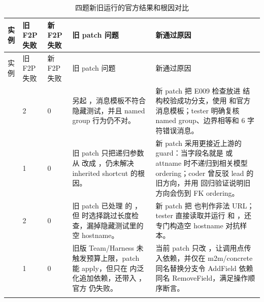 \documentclass[UTF8,a4paper,11pt]{ctexart}
\begin{document}
\begin{center}
{\scriptsize
\setlength{\tabcolsep}{2pt}
\begin{longtable}{L{3.0cm} C{1.2cm} C{1.2cm} L{3.7cm} L{4.5cm}}
\toprule
实例 & 旧 F2P 失败 & 新 F2P 失败 & 旧 patch 问题 & 新通过原因 \\
\midrule
\endfirsthead
\toprule
实例 & 旧 F2P 失败 & 新 F2P 失败 & 旧 patch 问题 & 新通过原因 \\
\midrule
\endhead
{} & 2 & 0 & 另起 ，消息模板不符合隐藏测试，并且 named group 行为仍不对。 & 新 patch 把 E009 检查放进  结构校验成功分支，使用  和官方消息模板；tester 明确复核 named group、边界相等和 6 字符错误消息。 \\
 & 1 & 0 & 旧 patch 只把递归参数从  改成 ，仍未解决 inherited  shortcut 的根因。 & 新 patch 采用更接近上游的 guard：当字段名就是  或 attname 时不递归到相关模型 ordering；coder 曾反驳 lead 的旧方向，并用  回归验证说明旧方向会伤到 FK ordering。 \\
 & 2 & 0 & 旧 patch 已处理  的 ，但  时选择跳过长度检查，漏掉隐藏测试里的空 hostname。 & 新 patch 把  也判作非法 URL；tester 直接读取并运行  和 ，还专门构造空 hostname 对抗样本。 \\
 & 1 & 0 & 旧版 Team/Harness 未触发预算上限，patch 能 apply，但只在  内泛化追加依赖，还带入 ，官方  仍失败。 & 当前 patch 只改 ，让调用点传入依赖，并仅在 m2m/concrete 同名替换分支令 AddField 依赖同名 RemoveField，满足操作顺序断言。 \\
\bottomrule
\caption{四题新旧运行的官方结果和根因对比}
\end{longtable}
}
\end{center}
\end{document}
